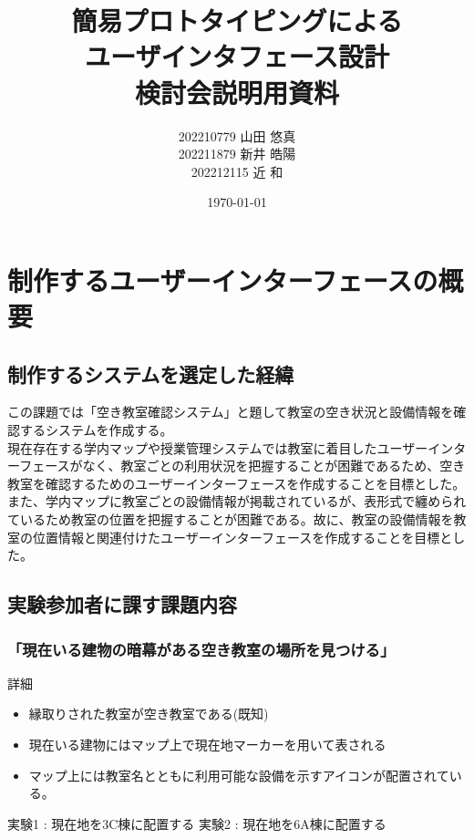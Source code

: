 \documentclass[12pt,a4paper,dvipdf]{jsarticle}
\title{簡易プロトタイピングによる\\ユーザインタフェース設計\\検討会説明用資料}
\author{202210779 山田 悠真\\202211879 新井 皓陽\\202212115 近 和}
\date{\today}
\begin{document}
\maketitle
\newpage


\section{制作するユーザーインターフェースの概要}
\subsection{制作するシステムを選定した経緯}
この課題では「空き教室確認システム」と題して教室の空き状況と設備情報を確認するシステムを作成する。\\
現在存在する学内マップや授業管理システムでは教室に着目したユーザーインターフェースがなく、教室ごとの利用状況を把握することが困難であるため、空き教室を確認するためのユーザーインターフェースを作成することを目標とした。また、学内マップに教室ごとの設備情報が掲載されているが、表形式で纏められているため教室の位置を把握することが困難である。故に、教室の設備情報を教室の位置情報と関連付けたユーザーインターフェースを作成することを目標とした。
\subsection{実験参加者に課す課題内容}
\subsubsection{「現在いる建物の暗幕がある空き教室の場所を見つける」}
詳細
\begin{itemize}
    \item 縁取りされた教室が空き教室である(既知)
    \item 現在いる建物にはマップ上で現在地マーカーを用いて表される
    \item マップ上には教室名とともに利用可能な設備を示すアイコンが配置されている。
\end{itemize}
実験1 : 現在地を3C棟に配置する
実験2 : 現在地を6A棟に配置する
\end{document}
